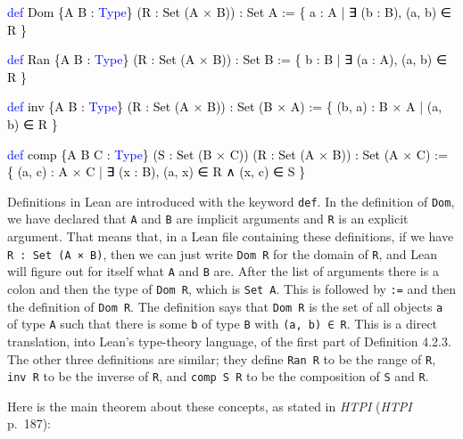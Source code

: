 \documentclass[
  letterpaper,
  DIV=11,
  numbers=noendperiod]{scrreprt}
\newenvironment{Shaded}{\begin{snugshade}}{\end{snugshade}}
\newcommand{\KeywordTok}[1]{\textcolor[rgb]{0.00,0.23,0.31}{#1}}
\newcommand{\NormalTok}[1]{\textcolor[rgb]{0.00,0.23,0.31}{#1}}
\renewcommand{\NormalTok}[1]{\textcolor[HTML]{000000}{#1}}
\renewcommand{\KeywordTok}[1]{\textcolor[HTML]{0000FF}{#1}}
\theoremstyle{remark}
\begin{document}
\begin{Shaded}
\begin{Highlighting}[]
\KeywordTok{def}\NormalTok{ Dom \{A B : }\KeywordTok{Type}\NormalTok{\} (R : Set (A × B)) : Set A :=}
\NormalTok{  \{ a : A | ∃ (b : B), (a, b) ∈ R \}}

\KeywordTok{def}\NormalTok{ Ran \{A B : }\KeywordTok{Type}\NormalTok{\} (R : Set (A × B)) : Set B :=}
\NormalTok{  \{ b : B | ∃ (a : A), (a, b) ∈ R \}}

\KeywordTok{def}\NormalTok{ inv \{A B : }\KeywordTok{Type}\NormalTok{\} (R : Set (A × B)) : Set (B × A) :=}
\NormalTok{  \{ (b, a) : B × A | (a, b) ∈ R \}}

\KeywordTok{def}\NormalTok{ comp \{A B C : }\KeywordTok{Type}\NormalTok{\}}
\NormalTok{    (S : Set (B × C)) (R : Set (A × B)) : Set (A × C) :=}
\NormalTok{  \{ (a, c) : A × C | ∃ (x : B), (a, x) ∈ R ∧ (x, c) ∈ S \}}
\end{Highlighting}
\end{Shaded}

Definitions in Lean are introduced with the keyword \texttt{def}. In the
definition of \texttt{Dom}, we have declared that \texttt{A} and
\texttt{B} are implicit arguments and \texttt{R} is an explicit
argument. That means that, in a Lean file containing these definitions,
if we have \texttt{R\ :\ Set\ (A\ ×\ B)}, then we can just write
\texttt{Dom\ R} for the domain of \texttt{R}, and Lean will figure out
for itself what \texttt{A} and \texttt{B} are. After the list of
arguments there is a colon and then the type of \texttt{Dom\ R}, which
is \texttt{Set\ A}. This is followed by \texttt{:=} and then the
definition of \texttt{Dom\ R}. The definition says that \texttt{Dom\ R}
is the set of all objects \texttt{a} of type \texttt{A} such that there
is some \texttt{b} of type \texttt{B} with \texttt{(a,\ b)\ ∈\ R}. This
is a direct translation, into Lean's type-theory language, of the first
part of Definition 4.2.3. The other three definitions are similar; they
define \texttt{Ran\ R} to be the range of \texttt{R}, \texttt{inv\ R} to
be the inverse of \texttt{R}, and \texttt{comp\ S\ R} to be the
composition of \texttt{S} and \texttt{R}.

Here is the main theorem about these concepts, as stated in \emph{HTPI}
(\emph{HTPI} p.~187):
\end{document}
